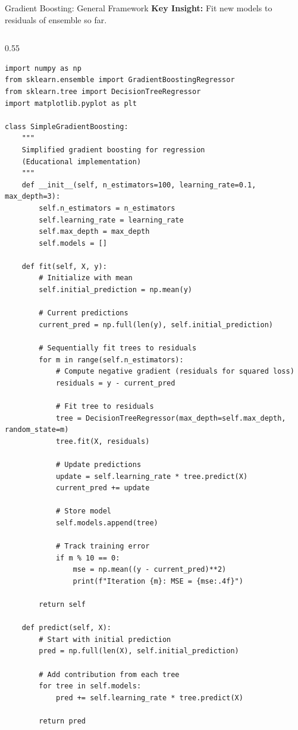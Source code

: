 \begin{frame}[fragile]{Gradient Boosting: General Framework}
\textbf{Key Insight:} Fit new models to residuals of ensemble so far.

\begin{columns}
\begin{column}{0.55\textwidth}
\begin{lstlisting}[basicstyle=\ttfamily\tiny]
import numpy as np
from sklearn.ensemble import GradientBoostingRegressor
from sklearn.tree import DecisionTreeRegressor
import matplotlib.pyplot as plt

class SimpleGradientBoosting:
    """
    Simplified gradient boosting for regression
    (Educational implementation)
    """
    def __init__(self, n_estimators=100, learning_rate=0.1, max_depth=3):
        self.n_estimators = n_estimators
        self.learning_rate = learning_rate
        self.max_depth = max_depth
        self.models = []

    def fit(self, X, y):
        # Initialize with mean
        self.initial_prediction = np.mean(y)

        # Current predictions
        current_pred = np.full(len(y), self.initial_prediction)

        # Sequentially fit trees to residuals
        for m in range(self.n_estimators):
            # Compute negative gradient (residuals for squared loss)
            residuals = y - current_pred

            # Fit tree to residuals
            tree = DecisionTreeRegressor(max_depth=self.max_depth, random_state=m)
            tree.fit(X, residuals)

            # Update predictions
            update = self.learning_rate * tree.predict(X)
            current_pred += update

            # Store model
            self.models.append(tree)

            # Track training error
            if m % 10 == 0:
                mse = np.mean((y - current_pred)**2)
                print(f"Iteration {m}: MSE = {mse:.4f}")

        return self

    def predict(self, X):
        # Start with initial prediction
        pred = np.full(len(X), self.initial_prediction)

        # Add contribution from each tree
        for tree in self.models:
            pred += self.learning_rate * tree.predict(X)

        return pred


\end{lstlisting}
\end{column}
\end{columns}
\end{frame}
